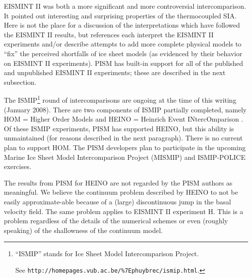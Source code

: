 \documentclass[11pt,final]{amsart}
\begin{document}
EISMINT II \cite{EISMINT00} was both a more significant and more controversial intercomparison.  It pointed out interesting and surprising properties of the thermocoupled SIA.  Here is not the place for a discussion of the interpretations which have followed the EISMINT II results, but references \cite{BBL,Hindmarsh04,Hindmarsh06,PayneBaldwin,SaitoEISMINT} each interpret the EISMINT II experiments and/or describe attempts to add more complete physical models to ``fix'' the perceived shortfalls of ice sheet models (as evidenced by their behavior on EISMINT II experiments).  PISM has built-in support for all of the published and unpublished EISMINT II experiments; these are described in the next subsection.

The ISMIP\footnote{``ISMIP'' stands for Ice Sheet Model Intercomparison Project.  

See \texttt{http://homepages.vub.ac.be/\%7Ephuybrec/ismip.html}.} round of intercomparisons are ongoing at the time of this writing (January 2008).  There are two components of ISMIP partially completed, namely HOM = Higher Order Models and HEINO = Heinrich Event INtercOmparison \cite{GreveTakahamaCalov}.  Of these ISMIP experiments, PISM has supported HEINO, but this ability is unmaintained (for reasons described in the next paragraph).  There is no current plan to support HOM.  The PISM developers plan to participate in the upcoming Marine Ice Sheet Model Intercomparison Project (MISMIP) and ISMIP-POLICE exercises.

The results from PISM for HEINO are not regarded by the PISM authors as meaningful.   We believe the continuum problem described by HEINO to not be easily approximate-able because of a (large) discontinuous jump in the basal velocity field.  The same problem applies to EISMINT II experiment H.  This is a problem regardless of the details of the numerical schemes or even (roughly speaking) of the shallowness of the continuum model.
\end{document}
